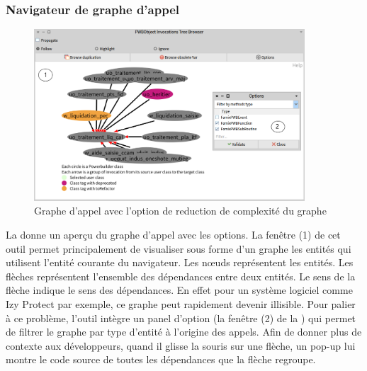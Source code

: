 \documentclass[a4paper]{article}
\begin{document}


\subsubsection{Navigateur de graphe d'appel}
\label{sec:callGraphBrowser}
\begin{figure}[htbp]
  \begin{center}
  \includegraphics[width=0.9\textwidth]{./figures/callGraphBrowser.png}
  \caption{Graphe d'appel avec l'option de reduction de complexité du graphe}
  \label{fig:graphAppel}
\end{center}
\vspace{-0.3cm}
\end{figure}
La  donne un aperçu du graphe d'appel avec les options.  
La fenêtre (1) de cet outil permet principalement de visualiser sous forme d'un graphe les entités qui utilisent l'entité courante du navigateur.
Les nœuds représentent les entités. Les flèches représentent l'ensemble des dépendances entre deux entités.
Le sens de la flèche indique le sens des dépendances.
En effet pour un système logiciel comme Izy Protect par exemple, ce graphe peut rapidement devenir illisible. 
Pour palier à ce problème, l'outil intègre un panel d'option (la fenêtre (2) de la ) qui permet de filtrer le graphe par type d'entité à l'origine des appels.
Afin de donner plus de contexte aux développeurs, quand il glisse la souris sur une flèche, un pop-up lui montre le code source de toutes les dépendances que la flèche regroupe.
\end{document}
